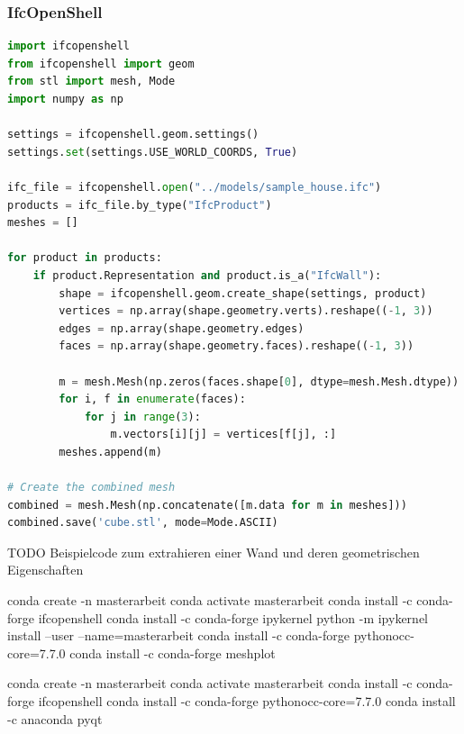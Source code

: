 \subsubsection{IfcOpenShell}
\begin{lstlisting}[language=Python, caption=Beispielprogrammcode um bestimmte Daten aus einem IFC File zu laden und daraus ein Mesh zu generieren]
import ifcopenshell
from ifcopenshell import geom
from stl import mesh, Mode
import numpy as np

settings = ifcopenshell.geom.settings()
settings.set(settings.USE_WORLD_COORDS, True)

ifc_file = ifcopenshell.open("../models/sample_house.ifc")
products = ifc_file.by_type("IfcProduct")
meshes = []

for product in products:
    if product.Representation and product.is_a("IfcWall"):
        shape = ifcopenshell.geom.create_shape(settings, product)
        vertices = np.array(shape.geometry.verts).reshape((-1, 3))
        edges = np.array(shape.geometry.edges)
        faces = np.array(shape.geometry.faces).reshape((-1, 3))

        m = mesh.Mesh(np.zeros(faces.shape[0], dtype=mesh.Mesh.dtype))
        for i, f in enumerate(faces):
            for j in range(3):
                m.vectors[i][j] = vertices[f[j], :]
        meshes.append(m)

# Create the combined mesh
combined = mesh.Mesh(np.concatenate([m.data for m in meshes]))
combined.save('cube.stl', mode=Mode.ASCII)
\end{lstlisting}
TODO Beispielcode zum extrahieren einer Wand und deren geometrischen Eigenschaften

conda create -n masterarbeit
conda activate masterarbeit
conda install -c conda-forge ifcopenshell
conda install -c conda-forge ipykernel
python -m ipykernel install --user --name=masterarbeit
conda install -c conda-forge pythonocc-core=7.7.0
conda install -c conda-forge meshplot 

conda create -n masterarbeit
conda activate masterarbeit
conda install -c conda-forge ifcopenshell
conda install -c conda-forge pythonocc-core=7.7.0
conda install -c anaconda pyqt 

